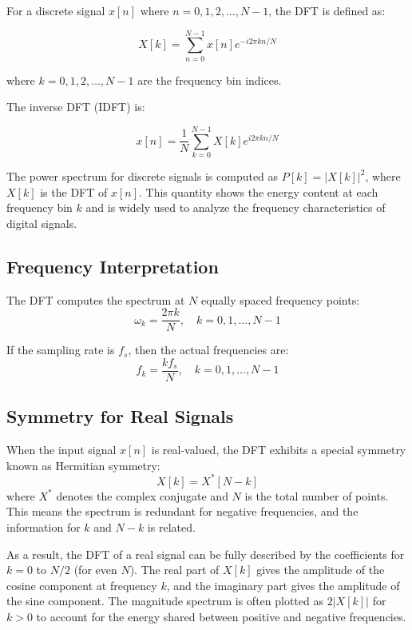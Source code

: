 \documentclass[11pt,a4paper]{article}
\begin{document}
For a discrete signal $x[n]$ where $n = 0, 1, 2, \ldots, N-1$, the DFT is defined as:

\begin{equation}
X[k] = \sum_{n=0}^{N-1} x[n] e^{-i 2\pi k n / N}
\end{equation}

where $k = 0, 1, 2, \ldots, N-1$ are the frequency bin indices.

The inverse DFT (IDFT) is:

\begin{equation}
x[n] = \frac{1}{N} \sum_{k=0}^{N-1} X[k] e^{i 2\pi k n / N}
\end{equation}

The power spectrum for discrete signals is computed as $P[k] = |X[k]|^2$, where $X[k]$ is the DFT of $x[n]$. This quantity shows the energy content at each frequency bin $k$ and is widely used to analyze the frequency characteristics of digital signals.

\subsection{Frequency Interpretation}

The DFT computes the spectrum at $N$ equally spaced frequency points:
\begin{equation}
\omega_k = \frac{2\pi k}{N}, \quad k = 0, 1, \ldots, N-1
\end{equation}

If the sampling rate is $f_s$, then the actual frequencies are:
\begin{equation}
f_k = \frac{k f_s}{N}, \quad k = 0, 1, \ldots, N-1
\end{equation}

\subsection{Symmetry for Real Signals}

When the input signal $x[n]$ is real-valued, the DFT exhibits a special symmetry known as Hermitian symmetry:
\begin{equation}
X[k] = X^*[N - k]
\end{equation}
where $X^*$ denotes the complex conjugate and $N$ is the total number of points. This means the spectrum is redundant for negative frequencies, and the information for $k$ and $N-k$ is related.

As a result, the DFT of a real signal can be fully described by the coefficients for $k = 0$ to $N/2$ (for even $N$). The real part of $X[k]$ gives the amplitude of the cosine component at frequency $k$, and the imaginary part gives the amplitude of the sine component. The magnitude spectrum is often plotted as $2|X[k]|$ for $k > 0$ to account for the energy shared between positive and negative frequencies.
\end{document}
